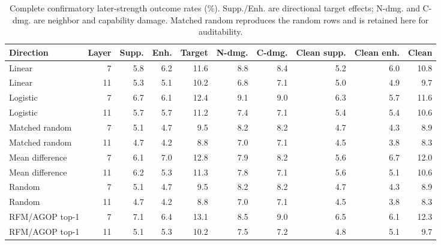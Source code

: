 \begin{table}[t]
\centering
\scriptsize
\caption{Complete confirmatory later-strength outcome rates (\%). Supp./Enh. are directional
target effects; N-dmg. and C-dmg. are neighbor and capability damage. Matched
random reproduces the random rows and is retained here for auditability.}
\label{tab:full-frozen-outcomes}
\begin{tabular}{lrrrrrrrrr}
\toprule
Direction & Layer & Supp. & Enh. & Target & N-dmg. & C-dmg. & Clean supp. & Clean enh. & Clean \\
\midrule
Linear & 7 & 5.8 & 6.2 & 11.6 & 8.8 & 8.4 & 5.2 & 6.0 & 10.8 \\
Linear & 11 & 5.3 & 5.1 & 10.2 & 6.8 & 7.1 & 5.0 & 4.9 & 9.7 \\
Logistic & 7 & 6.7 & 6.1 & 12.4 & 9.1 & 9.0 & 6.3 & 5.7 & 11.6 \\
Logistic & 11 & 5.7 & 5.7 & 11.2 & 7.4 & 7.1 & 5.4 & 5.4 & 10.6 \\
Matched random & 7 & 5.1 & 4.7 & 9.5 & 8.2 & 8.2 & 4.7 & 4.3 & 8.9 \\
Matched random & 11 & 4.7 & 4.2 & 8.8 & 7.0 & 7.1 & 4.5 & 3.8 & 8.3 \\
Mean difference & 7 & 6.1 & 7.0 & 12.8 & 7.9 & 8.2 & 5.6 & 6.7 & 12.0 \\
Mean difference & 11 & 6.2 & 5.3 & 11.3 & 7.8 & 7.1 & 5.6 & 5.1 & 10.6 \\
Random & 7 & 5.1 & 4.7 & 9.5 & 8.2 & 8.2 & 4.7 & 4.3 & 8.9 \\
Random & 11 & 4.7 & 4.2 & 8.8 & 7.0 & 7.1 & 4.5 & 3.8 & 8.3 \\
RFM/AGOP top-1 & 7 & 7.1 & 6.4 & 13.1 & 8.5 & 9.0 & 6.5 & 6.1 & 12.3 \\
RFM/AGOP top-1 & 11 & 5.1 & 5.3 & 10.2 & 7.5 & 7.2 & 4.8 & 5.1 & 9.7 \\
\bottomrule
\end{tabular}
\end{table}
